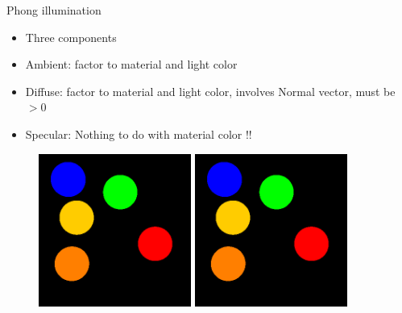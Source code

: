 \documentclass{beamer}
\begin{document}
\begin{frame}{Phong illumination}

\begin{itemize}
  \item Three components
  \item Ambient: factor to material and light color
  \item Diffuse: factor to material and light color, involves Normal vector, must be $> 0$
  \item Specular: Nothing to do with material color !!
\end{itemize}

   \begin{figure}[ht]
       \includegraphics[width=5cm]{scene01.png} %
       \includegraphics[width=5cm]{scene01.png} %
    \end{figure}

\end{frame}
\end{document}
